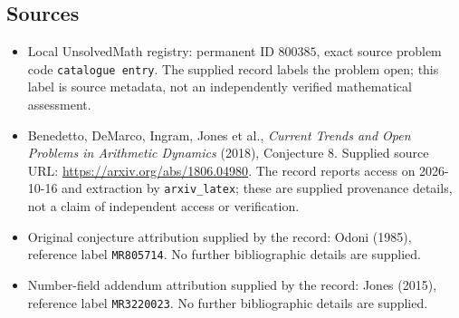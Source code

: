 \documentclass[11pt]{article}
\begin{document}
\subsection{Sources}
\begin{itemize}
\item Local UnsolvedMath registry: permanent ID \(800385\), exact source problem code \texttt{catalogue entry}. The supplied record labels the problem open; this label is source metadata, not an independently verified mathematical assessment.
\item Benedetto, DeMarco, Ingram, Jones et al., \emph{Current Trends and Open Problems in Arithmetic Dynamics} (2018), Conjecture 8. Supplied source URL: \url{https://arxiv.org/abs/1806.04980}. The record reports access on 2026-10-16 and extraction by \texttt{arxiv\_latex}; these are supplied provenance details, not a claim of independent access or verification.
\item Original conjecture attribution supplied by the record: Odoni (1985), reference label \texttt{MR805714}. No further bibliographic details are supplied.
\item Number-field addendum attribution supplied by the record: Jones (2015), reference label \texttt{MR3220023}. No further bibliographic details are supplied.
\end{itemize}
\end{document}
